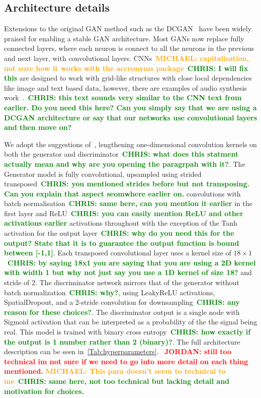 \documentclass[12pt]{iopart}
\newcommand{\jordan}[1]{\textbf{\textcolor{red}{JORDAN: #1}}}
\newcommand{\chris}[1]{\textbf{\textcolor{green}{CHRIS: #1}}}
\newcommand{\michael}[1]{\textbf{\textcolor{orange}{MICHAEL: #1}}}
\begin{document}
\subsection{Architecture details}
%
%
Extensions to the original \ac{GAN} method such as the
\ac{DCGAN}~\cite{Radford2015} have been widely praised for enabling a stable
\ac{GAN} architecture. Most GANs now replace fully connected layers, where each
neuron is connect to all the neurons in the previous and next layer, with
convolutional layers. \acp{CNN}~\michael{capitalisation, not sure how it works
with the accronyms package}~\chris{I will fix this} are designed to work with
grid-like structures with close local dependencies like image and text based
data, however, there are examples of audio synthesis
work~\cite{DBLP:journals/corr/abs-1809-11096}.~\chris{this text sounds very
similar to the CNN text from earlier. Do you need this here? Can you simply say
that we are using a DCGAN architecture or say that our networks use
convolutional layers and then move on?}

%
We adopt the suggestions
of~\cite{Radford2015,DBLP:journals/corr/abs-1809-11096}, lengthening
one-dimensional convolution kernels on both the generator and
discriminator~\chris{what does this statment actually mean and why are you
opening the paragrpah with it?}.  The Generator model is fully convolutional,
upsampled using strided transposed~\chris{you mentioned strides before but not
transposing. Can you explain that aspect seomwhere earlier on.} convolutions
with batch normalisation~\chris{same here, can you mention it earlier} in the
first layer and ReLU~\chris{you can easily mention ReLU and other activations
earlier} activations throughout with the exception of the Tanh activation for
the output layer~\chris{why do you need this for the output? State that it is
to guarantee the output function is bound between [-1,1]}. Each transposed
convolutional layer uses a kernel size of $18\times 1$~\chris{by saying 18x1
you are saying that you are using a 2D kernel with width 1 but why not just say
you use a 1D kernel of size 18?} and stride of 2. The discriminator network
mirrors that of the generator without batch normalization~\chris{why?}, using
LeakyReLU activations, SpatialDropout, and a 2-stride convolution for
downsampling~\chris{any reason for these choices?}. The discriminator output is
a single node with Sigmoid activation that can be interpreted as a probability
of the the signal being real. This model is trained with binary cross
entropy~\chris{how exactly if the output is 1 number rather than 2 (binary)?}.
The full architecture description can be seen in~\cref{Tab:hyperparameters}.
~\jordan{still too technical im not sure if we need to go into more detail on
each thing mentioned.} \michael{This para doesn't seem to technical to
me}~\chris{same here, not too technical but lacking detail and motivation for
choices.}
\end{document}
